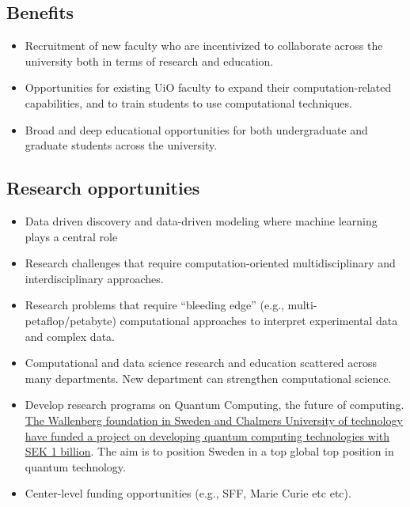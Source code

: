 \documentclass[%
oneside,                 %
final,                   %
10pt]{article}
\begin{document}
\noindent
\subsection*{Benefits}

\begin{itemize}
\item Recruitment of new faculty who are incentivized to collaborate across the university both in terms of research and education.

\item Opportunities for existing UiO faculty to expand their computation-related capabilities, and to train students to use computational techniques.	

\item Broad and deep educational opportunities for both undergraduate and graduate students across the university.	
\end{itemize}

\noindent
\subsection*{Research opportunities}

\begin{itemize}
\item Data driven discovery and data-driven modeling where machine learning plays a central role

\item Research challenges that require computation-oriented multidisciplinary and interdisciplinary approaches.	

\item Research problems that require “bleeding edge” (e.g., multi-petaflop/petabyte) computational approaches to interpret experimental data and complex data.

\item Computational and data science research and education scattered across many departments. New department can strengthen computational science. 	

\item Develop research programs on Quantum Computing, the future of computing.  \href{{https://www.chalmers.se/en/news/Pages/Engineering-of-a-Swedish-quantum-computer-set-to-start.aspx}}{The Wallenberg foundation in Sweden and Chalmers University of technology have funded a project on developing quantum computing technologies with SEK 1 billion}. The aim is to position  Sweden in  a top global top position in quantum technology. 

\item Center-level funding opportunities (e.g., SFF, Marie Curie etc etc).	
\end{itemize}
\end{document}
